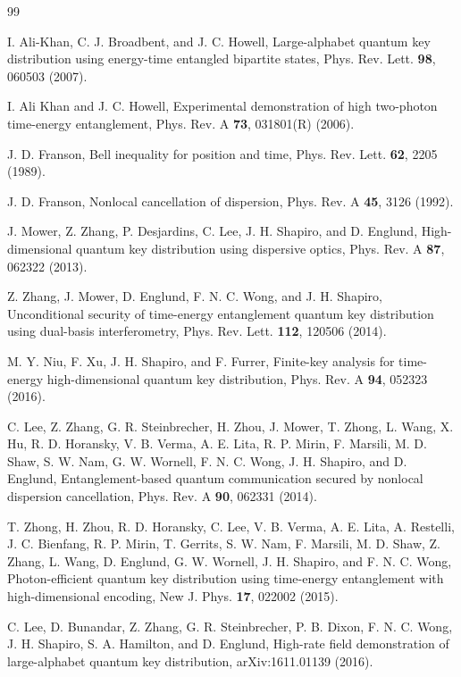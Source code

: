 \documentclass[11pt]{article}
\begin{document}
\begin{thebibliography}{99}

 I. Ali-Khan, C. J. Broadbent, and J. C. Howell, Large-alphabet quantum key distribution using energy-time entangled bipartite states, Phys. Rev. Lett. \textbf{98}, 060503 (2007).

 I. Ali Khan and J. C. Howell, Experimental demonstration of high two-photon time-energy entanglement, Phys. Rev. A \textbf{73}, 031801(R) (2006).

 J. D. Franson, Bell inequality for position and time, Phys. Rev. Lett. \textbf{62}, 2205 (1989).

 J. D. Franson, Nonlocal cancellation of dispersion, Phys. Rev. A \textbf{45}, 3126 (1992).

 J. Mower, Z. Zhang, P. Desjardins, C. Lee, J. H. Shapiro, and D. Englund, High-dimensional quantum key distribution using dispersive optics, Phys. Rev. A \textbf{87}, 062322 (2013).

 Z. Zhang, J. Mower, D. Englund, F. N. C. Wong, and J. H. Shapiro, Unconditional security of time-energy entanglement quantum key distribution using dual-basis interferometry, Phys. Rev. Lett. \textbf{112}, 120506 (2014).

 M. Y. Niu, F. Xu, J. H. Shapiro, and F. Furrer, Finite-key analysis for time-energy high-dimensional quantum key distribution, Phys. Rev. A \textbf{94}, 052323 (2016).

 C. Lee, Z. Zhang, G. R. Steinbrecher, H. Zhou, J. Mower, T. Zhong, L. Wang, X. Hu, R. D. Horansky, V. B. Verma, A. E. Lita, R. P. Mirin, F. Marsili, M. D. Shaw, S. W. Nam, G. W. Wornell, F. N. C. Wong, J. H. Shapiro, and D. Englund, Entanglement-based quantum communication secured by nonlocal dispersion cancellation, Phys. Rev. A \textbf{90}, 062331 (2014).

 T. Zhong, H. Zhou, R. D. Horansky, C. Lee, V. B. Verma, A. E. Lita, A. Restelli, J. C. Bienfang, R. P. Mirin, T. Gerrits, S. W. Nam, F. Marsili, M. D. Shaw, Z. Zhang, L. Wang, D. Englund, G. W. Wornell, J. H. Shapiro, and F. N. C. Wong, Photon-efficient quantum key distribution using time-energy entanglement with high-dimensional encoding, New J. Phys. \textbf{17}, 022002 (2015).

 C. Lee, D. Bunandar, Z. Zhang, G. R. Steinbrecher, P. B. Dixon, F. N. C. Wong, J. H. Shapiro, S. A. Hamilton, and D. Englund, High-rate field demonstration of large-alphabet quantum key distribution, arXiv:1611.01139 (2016).


\end{thebibliography}
\end{document}
